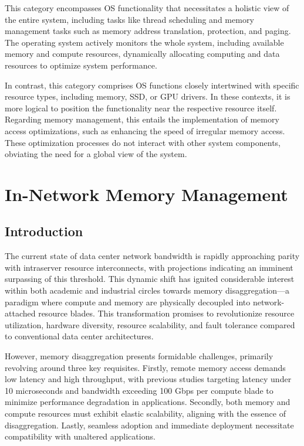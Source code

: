  This category encompasses OS functionality that necessitates a holistic view of the entire system, including tasks like thread scheduling and memory management tasks such as memory address translation, protection, and paging. The operating system actively monitors the whole system, including available memory and compute resources, dynamically allocating computing and data resources to optimize system performance.

 In contrast, this category comprises OS functions closely intertwined with specific resource types, including memory, SSD, or GPU drivers. In these contexts, it is more logical to position the functionality near the respective resource itself. Regarding memory management, this entails the implementation of memory access optimizations, such as enhancing the speed of irregular memory access. These optimization processes do not interact with other system components, obviating the need for a global view of the system.

\section{In-Network Memory Management}
\subsection{Introduction}
The current state of data center network bandwidth is rapidly approaching parity with intraserver resource interconnects, with projections indicating an imminent surpassing of this threshold. This dynamic shift has ignited considerable interest within both academic and industrial circles towards memory disaggregation—a paradigm where compute and memory are physically decoupled into network-attached resource blades. This transformation promises to revolutionize resource utilization, hardware diversity, resource scalability, and fault tolerance compared to conventional data center architectures.

However, memory disaggregation presents formidable challenges, primarily revolving around three key requisites. Firstly, remote memory access demands low latency and high throughput, with previous studies targeting latency under 10 microseconds and bandwidth exceeding 100 Gbps per compute blade to minimize performance degradation in applications. Secondly, both memory and compute resources must exhibit elastic scalability, aligning with the essence of disaggregation. Lastly, seamless adoption and immediate deployment necessitate compatibility with unaltered applications.

